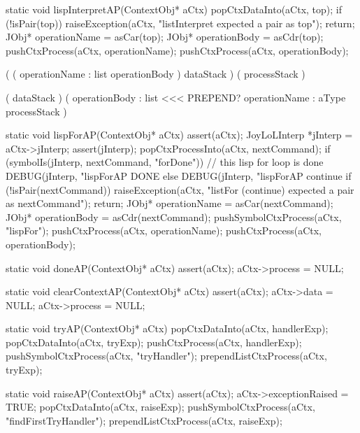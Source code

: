 \stoptyping

\startCCode
static void lispInterpretAP(ContextObj* aCtx) {
  popCtxDataInto(aCtx, top);
  if (!isPair(top)) {
    raiseException(aCtx,
      "listInterpret expected a pair as top");
    return;
  }
  JObj* operationName = asCar(top);
  JObj* operationBody = asCdr(top);
  pushCtxProcess(aCtx, operationName);
  pushCtxProcess(aCtx, operationBody);
}
\stopCCode

\starttyping

\startWord[lispInterpret]

\preDataStack
  (
    (
      operationName : list
      operationBody
    )
    dataStack 
  )
\preProcessStack
  (
    processStack
  )
\preConditions
\stopPreStack

\postDataStack
  ( dataStack )
\postProcessStack
  (
    operationBody : list <<< PREPEND?
    operationName : aType
    processStack
  )
\postConditions
\stopPostStack

\stopWord

\stoptyping

\startCCode
static void lispForAP(ContextObj* aCtx) {
  assert(aCtx);
  JoyLoLInterp *jInterp = aCtx->jInterp;
  assert(jInterp);
  popCtxProcessInto(aCtx, nextCommand);
  if (symbolIs(jInterp, nextCommand, "forDone")) {
    // this lisp for loop is done
    DEBUG(jInterp, "lispForAP DONE%
  } else {
    DEBUG(jInterp, "lispForAP continue%
    if (!isPair(nextCommand)) {
      raiseException(aCtx,
        "listFor (continue) expected a pair as nextCommand");
      return;
    }
    JObj* operationName = asCar(nextCommand);
    JObj* operationBody = asCdr(nextCommand);
    pushSymbolCtxProcess(aCtx, "lispFor");
    pushCtxProcess(aCtx, operationName);
    pushCtxProcess(aCtx, operationBody);
  }
}
\stopCCode

\startCCode
static void doneAP(ContextObj* aCtx) {
  assert(aCtx);
  aCtx->process = NULL;
}
\stopCCode

\startCCode
static void clearContextAP(ContextObj* aCtx) {
  assert(aCtx);
  aCtx->data    = NULL;
  aCtx->process = NULL;
}
\stopCCode

\startCCode
static void tryAP(ContextObj* aCtx) {
  popCtxDataInto(aCtx, handlerExp);
  popCtxDataInto(aCtx, tryExp);
  pushCtxProcess(aCtx, handlerExp);
  pushSymbolCtxProcess(aCtx, "tryHandler");
  prependListCtxProcess(aCtx, tryExp);
}
\stopCCode

\startCCode
static void raiseAP(ContextObj* aCtx) {
  assert(aCtx);
  aCtx->exceptionRaised = TRUE;
  popCtxDataInto(aCtx, raiseExp);
  pushSymbolCtxProcess(aCtx, "findFirstTryHandler");
  prependListCtxProcess(aCtx, raiseExp);
}
\stopCCode

